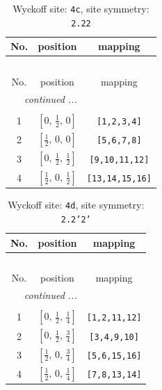 \documentclass[fleqn,8pt]{jsarticle}
\begin{document}
\renewcommand{\arraystretch}{1.2}
\begin{longtable}{ccc}
\caption{Wyckoff site: {\tt 4c}, site symmetry: {\tt 2.22}}
 \\
 \hline \hline
No. & position & mapping \\ \hline \endfirsthead

\multicolumn{2}{l}{\tablename\ \thetable{}} \\
 \hline \hline
No. & position & mapping \\ \hline \endhead

 \hline \hline
\multicolumn{2}{r}{\footnotesize\it continued ...} \\ \endfoot

 \hline \hline
\multicolumn{2}{r}{} \\ \endlastfoot

1 & $\left[ 0,\, \frac{1}{2},\, 0 \right]$ & {\tt [1,2,3,4]} \\ \hline
2 & $\left[ \frac{1}{2},\, 0,\, 0 \right]$ & {\tt [5,6,7,8]} \\ \hline
3 & $\left[ 0,\, \frac{1}{2},\, \frac{1}{2} \right]$ & {\tt [9,10,11,12]} \\ \hline
4 & $\left[ \frac{1}{2},\, 0,\, \frac{1}{2} \right]$ & {\tt [13,14,15,16]} \\
\end{longtable}
\renewcommand{\arraystretch}{1.2}
\begin{longtable}{ccc}
\caption{Wyckoff site: {\tt 4d}, site symmetry: {\tt 2.2'2'}}
 \\
 \hline \hline
No. & position & mapping \\ \hline \endfirsthead

\multicolumn{2}{l}{\tablename\ \thetable{}} \\
 \hline \hline
No. & position & mapping \\ \hline \endhead

 \hline \hline
\multicolumn{2}{r}{\footnotesize\it continued ...} \\ \endfoot

 \hline \hline
\multicolumn{2}{r}{} \\ \endlastfoot

1 & $\left[ 0,\, \frac{1}{2},\, \frac{1}{4} \right]$ & {\tt [1,2,11,12]} \\ \hline
2 & $\left[ 0,\, \frac{1}{2},\, \frac{3}{4} \right]$ & {\tt [3,4,9,10]} \\ \hline
3 & $\left[ \frac{1}{2},\, 0,\, \frac{3}{4} \right]$ & {\tt [5,6,15,16]} \\ \hline
4 & $\left[ \frac{1}{2},\, 0,\, \frac{1}{4} \right]$ & {\tt [7,8,13,14]} \\
\end{longtable}
\end{document}
